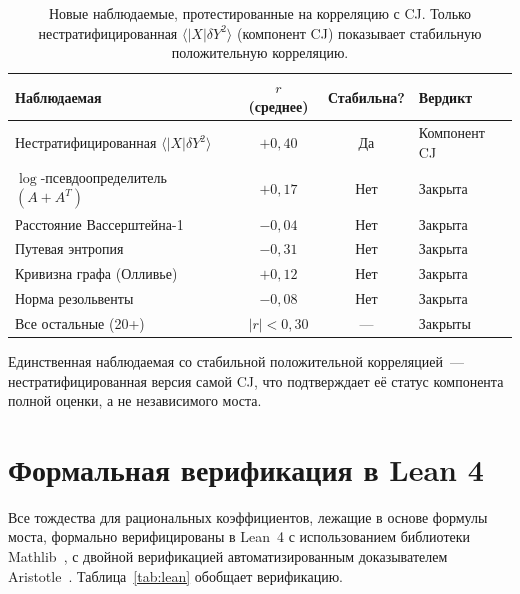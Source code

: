 \documentclass[12pt,a4paper]{article}
\theoremstyle{plain}
\theoremstyle{definition}
\theoremstyle{remark}
\begin{document}
\begin{table}[ht]
\centering
\caption{Новые наблюдаемые, протестированные на корреляцию с
CJ.  Только нестратифицированная
$\langle |X| \delta Y^2 \rangle$ (компонент CJ) показывает
стабильную положительную корреляцию.}
\label{tab:novel}
\begin{tabular}{lccl}
\toprule
Наблюдаемая & $r$ (среднее) & Стабильна? & Вердикт \\
\midrule
Нестратифицированная $\langle|X|\delta Y^2\rangle$ & $+0{,}40$ & Да & Компонент CJ \\
$\log$-псевдоопределитель$(A+A^T)$ & $+0{,}17$ & Нет & Закрыта \\
Расстояние Вассерштейна-1 & $-0{,}04$ & Нет & Закрыта \\
Путевая энтропия & $-0{,}31$ & Нет & Закрыта \\
Кривизна графа (Олливье) & $+0{,}12$ & Нет & Закрыта \\
Норма резольвенты & $-0{,}08$ & Нет & Закрыта \\
Все остальные (20+) & $|r| < 0{,}30$ & --- & Закрыты \\
\bottomrule
\end{tabular}
\end{table}

Единственная наблюдаемая со стабильной положительной
корреляцией~--- нестратифицированная версия самой CJ, что
подтверждает её статус компонента полной оценки, а не
независимого моста.

\section{Формальная верификация в Lean 4}
\label{sec:lean}

Все тождества для рациональных коэффициентов, лежащие в
основе формулы моста, формально верифицированы в Lean~4 с
использованием библиотеки Mathlib~\cite{Mathlib:2024}, с
двойной верификацией автоматизированным доказывателем
Aristotle~\cite{Aristotle:2025}.
Таблица~\ref{tab:lean} обобщает верификацию.
\end{document}
